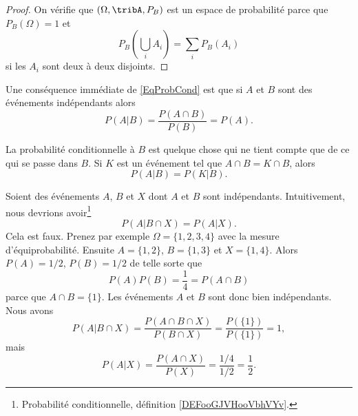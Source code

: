 \begin{proof}
	On vérifie que \( (\Omega,\tribA,P_B)\) est un espace de probabilité parce que \( P_B(\Omega)=1\) et
	\begin{equation}
		P_B(\bigcup_iA_i)=\sum_iP_B(A_i)
	\end{equation}
	si les \( A_i\) sont deux à deux disjoints.
\end{proof}

Une conséquence immédiate de \eqref{EqProbCond} est que si \( A\) et \( B\) sont des événements indépendants alors
\begin{equation}
	P(A|B)=\frac{ P(A\cap B) }{ P(B) }=P(A).
\end{equation}

La probabilité conditionnelle à \( B\) est quelque chose qui ne tient compte que de ce qui se passe dans \( B\). Si \( K\) est un événement tel que \( A\cap B=K\cap B\), alors
\begin{equation}    \label{EqOVHCWom}
	P(A|B)=P(K|B).
\end{equation}


\begin{example}       \label{EXooIAYTooFjFTrT}
	Soient des événements \( A\), \( B\) et \( X\) dont \( A\) et \( B\) sont indépendants. Intuitivement, nous devrions avoir\footnote{Probabilité conditionnelle, définition \ref{DEFooGJVHooVbhVYv}.}
	\begin{equation}
		P(A|B\cap X)=P(A|X).
	\end{equation}
	Cela est faux. Prenez par exemple \( \Omega=\{ 1,2,3,4 \}\) avec la mesure d'équiprobabilité. Ensuite \( A=\{ 1,2 \}\), \( B=\{ 1,3 \}\) et \( X=\{ 1,4 \}\). Alors \( P(A)=1/2\), \( P(B)=1/2\) de telle sorte que
	\begin{equation}
		P(A)P(B)=\frac{1}{ 4 }=P(A\cap B)
	\end{equation}
	parce que \( A\cap B=\{ 1 \}\). Les événements \( A\) et \( B\) sont donc bien indépendants. Nous avons
	\begin{equation}
		P(A|B\cap X)=\frac{ P(A\cap B\cap X) }{ P(B\cap X) }=\frac{ P(\{ 1 \}) }{ P(\{ 1 \})  }=1,
	\end{equation}
	mais
	\begin{equation}
		P(A|X)=\frac{ P(A\cap X) }{ P(X) }=\frac{ 1/4 }{ 1/2 }=\frac{1}{ 2 }.
	\end{equation}
\end{example}


